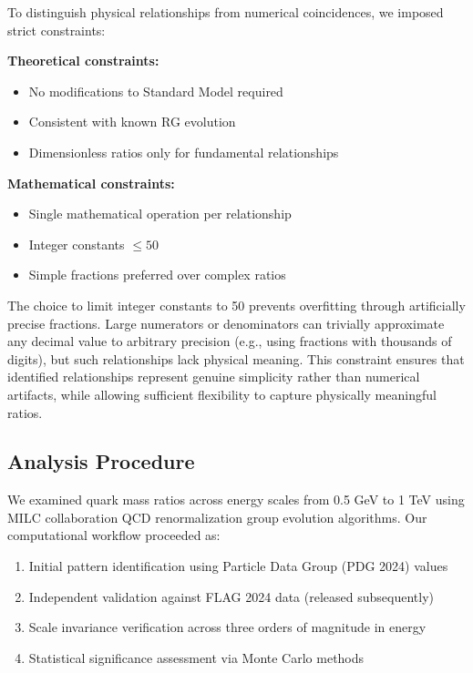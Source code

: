 \documentclass[12pt]{article}
\begin{document}
To distinguish physical relationships from numerical coincidences, we imposed strict constraints:

\textbf{Theoretical constraints:}
\begin{itemize}
\item No modifications to Standard Model required
\item Consistent with known RG evolution
\item Dimensionless ratios only for fundamental relationships
\end{itemize}

\textbf{Mathematical constraints:}
\begin{itemize}
\item Single mathematical operation per relationship
\item Integer constants $\leq 50$
\item Simple fractions preferred over complex ratios
\end{itemize}

The choice to limit integer constants to 50 prevents overfitting through artificially precise fractions. Large numerators or denominators can trivially approximate any decimal value to arbitrary precision (e.g., using fractions with thousands of digits), but such relationships lack physical meaning. This constraint ensures that identified relationships represent genuine simplicity rather than numerical artifacts, while allowing sufficient flexibility to capture physically meaningful ratios.

\subsection{Analysis Procedure}

We examined quark mass ratios across energy scales from 0.5 GeV to 1 TeV using MILC collaboration QCD renormalization group evolution algorithms. Our computational workflow proceeded as:

\begin{enumerate}
\item Initial pattern identification using Particle Data Group (PDG 2024) values
\item Independent validation against FLAG 2024 data (released subsequently)
\item Scale invariance verification across three orders of magnitude in energy
\item Statistical significance assessment via Monte Carlo methods
\end{enumerate}
\end{document}
